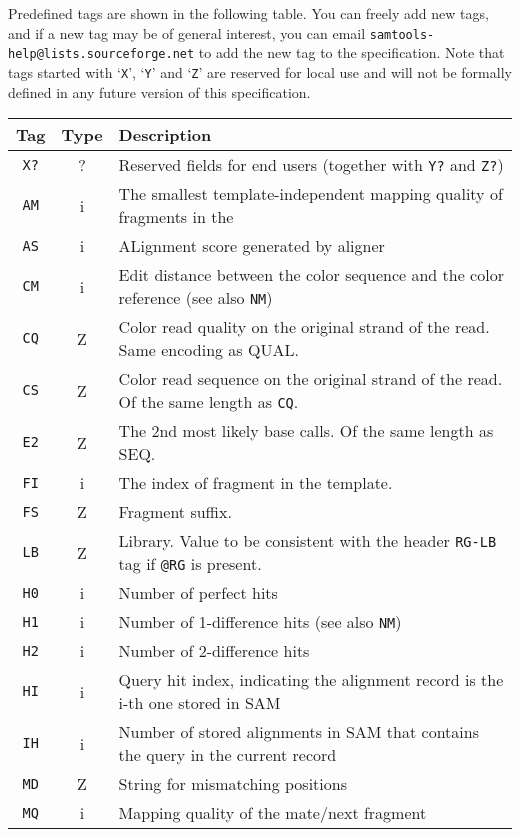 \documentclass[10pt]{article}
\begin{document}
{\flushleft Predefined tags are shown in the following table. You can
  freely add new tags, and if a new tag may be of general interest, you
  can email {\tt samtools-help@lists.sourceforge.net} to add the new tag
  to the specification. Note that tags started with `{\tt X}', `{\tt Y}'
  and `{\tt Z}' are reserved for local use and will not be formally
  defined in any future version of this specification.}
\begin{center}\small
\begin{tabular}{ccp{12.5cm}}
  \hline
  {\bf Tag} & {\bf Type} & {\bf Description} \\
  \hline
  {\tt X?} & ? & Reserved fields for end users (together with {\tt Y?} and {\tt Z?}) \\
  {\tt AM} & i & The smallest template-independent mapping quality of fragments in the  \\
  {\tt AS} & i & ALignment score  generated by aligner \\
  {\tt CM} & i & Edit distance between the color sequence and the color reference (see also {\tt NM})\\
  {\tt CQ} & Z & Color read quality on the original strand of the read. Same encoding as {\sf QUAL}.\\
  {\tt CS} & Z & Color read sequence on the original strand of the read. Of the same length as {\tt CQ}. \\
  {\tt E2} & Z & The 2nd most likely base calls. Of the same length as {\sf SEQ}. \\
  {\tt FI} & i & The index of fragment in the template.\\
  {\tt FS} & Z & Fragment suffix.\\
  {\tt LB} & Z & Library. Value to be consistent with the header {\tt RG-LB} tag if {\tt @RG} is present.\\
  {\tt H0} & i & Number of perfect hits\\
  {\tt H1} & i & Number of 1-difference hits (see also {\tt NM})\\
  {\tt H2} & i & Number of 2-difference hits \\
  {\tt HI} & i & Query hit index, indicating the alignment record is the i-th one stored in SAM\\
  {\tt IH} & i & Number of stored alignments in SAM that contains the query in the current record\\
  {\tt MD} & Z & String for mismatching positions \\
  {\tt MQ} & i & Mapping quality of the mate/next fragment \\

\end{tabular}
\end{center}
\end{document}
